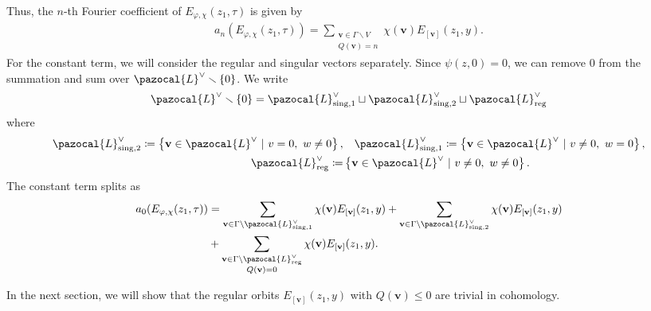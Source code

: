 \documentclass[a4paper,11pt]{amsart} %
\newcommand{\8}{\infty}
\newcommand{\vbf}{\mathbf{v}}
\newcommand{\sing}{\mathrm{sing}}
\newcommand{\reg}{\mathrm{reg}}
\newcommand{\Lcal}{\pazocal{L}}
\theoremstyle{mytheoremstyle}
\theoremstyle{remark}
\numberwithin{equation}{section}
\begin{document}
Thus, the $n$-th Fourier coefficient of $E_{\varphi, \chi}(z_1,\tau)$ is given by
\begin{align}
a_n(E_{\varphi, \chi}(z_1,\tau))=\sum_{\substack{\vbf \in \Gamma \backslash V \\ Q(\vbf)=n}}\chi(\vbf)  E_{[\vbf]}(z_1,y).
\end{align}
For the constant term, we will consider the regular and singular vectors separately. Since $\psi(z,0)=0$, we can remove $0$ from the summation and sum over $\Lcal^\vee \smallsetminus \{0\}$. We write
\begin{align*}
\Lcal^\vee \smallsetminus \{0\}=\Lcal^\vee_{\sing,1} \sqcup \Lcal^\vee_{\sing,2} \sqcup \Lcal^\vee_{\reg}
\end{align*}
where
\begin{align*}
\Lcal^\vee_{\sing,2} \coloneqq  \left \{ \vbf \in \Lcal^\vee  \ \vert \ v = 0, \ w \neq 0\right \}, & \quad
\Lcal^\vee_{\sing,1} \coloneqq \left \{ \vbf \in \Lcal^\vee  \ \vert \ v\neq0, \ w = 0\right \}, \\
\Lcal^\vee_\reg \coloneqq &\left \{ \vbf \in \Lcal^\vee  \ \vert \ v\neq0, \ w \neq 0\right \}.
\end{align*}
The constant term splits as
\begin{align} \label{eq constant term}
a_0(E_{\varphi, \chi}(z_1,\tau)) & =\sum_{\vbf \in \Gamma \backslash \Lcal^\vee_{\sing,1} } \chi(\vbf) E_{[\vbf]}(z_1,y) + \sum_{\vbf \in \Gamma \backslash \Lcal^\vee_{\sing,2}} \chi(\vbf) E_{[\vbf]}(z_1,y) \nonumber \\
& + \sum_{\substack{\vbf \in \Gamma \backslash \Lcal^\vee_{\reg} \\ Q(\vbf)=0}} \chi(\vbf) E_{[\vbf]}(z_1,y).
\end{align}





In the next section, we will show that the  regular orbits $E_{[\vbf]}(z_1,y)$ with $Q(\vbf) \leq 0$ are trivial in cohomology.
\end{document}
